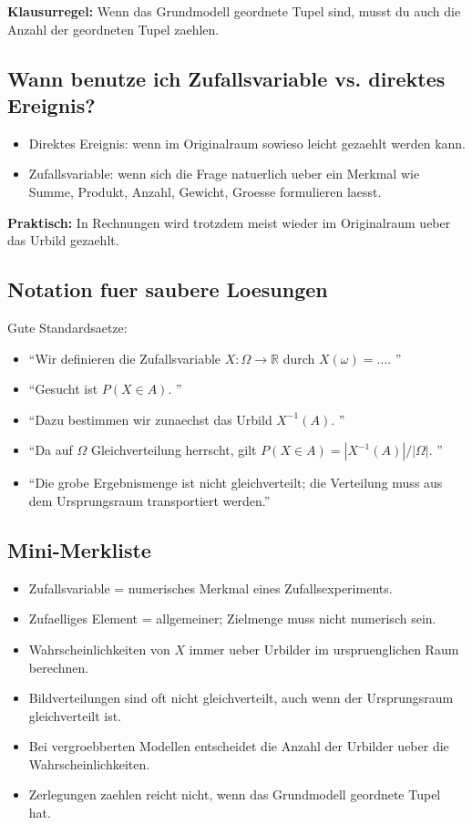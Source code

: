 \documentclass[a4paper,11pt]{article}
\begin{document}
\textbf{Klausurregel:}
Wenn das Grundmodell geordnete Tupel sind, musst du auch die Anzahl der geordneten Tupel zaehlen.

\subsection{Wann benutze ich Zufallsvariable vs. direktes Ereignis?}
\begin{itemize}
  \item Direktes Ereignis: wenn im Originalraum sowieso leicht gezaehlt werden kann.
  \item Zufallsvariable: wenn sich die Frage natuerlich ueber ein Merkmal wie Summe, Produkt, Anzahl, Gewicht, Groesse formulieren laesst.
\end{itemize}

\textbf{Praktisch:}
In Rechnungen wird trotzdem meist wieder im Originalraum ueber das Urbild gezaehlt.

\subsection{Notation fuer saubere Loesungen}
Gute Standardsaetze:
\begin{itemize}
  \item ``Wir definieren die Zufallsvariable $X:\Omega \to \mathbb{R}$ durch $X(\omega)=\dots$. ''
  \item ``Gesucht ist $P(X \in A)$. ''
  \item ``Dazu bestimmen wir zunaechst das Urbild $X^{-1}(A)$. ''
  \item ``Da auf $\Omega$ Gleichverteilung herrscht, gilt $P(X \in A)=|X^{-1}(A)|/|\Omega|$. ''
  \item ``Die grobe Ergebnismenge ist nicht gleichverteilt; die Verteilung muss aus dem Ursprungsraum transportiert werden.''
\end{itemize}

\subsection{Mini-Merkliste}
\begin{itemize}
  \item Zufallsvariable = numerisches Merkmal eines Zufallsexperiments.
  \item Zufaelliges Element = allgemeiner; Zielmenge muss nicht numerisch sein.
  \item Wahrscheinlichkeiten von $X$ immer ueber Urbilder im urspruenglichen Raum berechnen.
  \item Bildverteilungen sind oft nicht gleichverteilt, auch wenn der Ursprungsraum gleichverteilt ist.
  \item Bei vergroebberten Modellen entscheidet die Anzahl der Urbilder ueber die Wahrscheinlichkeiten.
  \item Zerlegungen zaehlen reicht nicht, wenn das Grundmodell geordnete Tupel hat.
\end{itemize}
\end{document}
